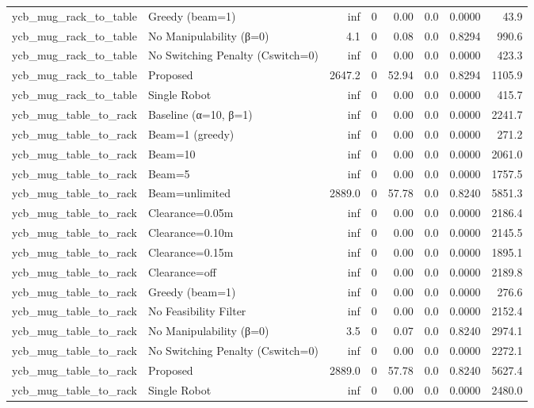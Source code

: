 \begin{table}[ht]
{\begin{tabular}{l l r r r r r r}
  ycb\_mug\_rack\_to\_table & Greedy (beam=1) & inf & 0 & 0.00 & 0.0 & 0.0000 & 43.9 \\
  ycb\_mug\_rack\_to\_table & No Manipulability (β=0) & 4.1 & 0 & 0.08 & 0.0 & 0.8294 & 990.6 \\
  ycb\_mug\_rack\_to\_table & No Switching Penalty (Cswitch=0) & inf & 0 & 0.00 & 0.0 & 0.0000 & 423.3 \\
  ycb\_mug\_rack\_to\_table & Proposed & 2647.2 & 0 & 52.94 & 0.0 & 0.8294 & 1105.9 \\
  ycb\_mug\_rack\_to\_table & Single Robot & inf & 0 & 0.00 & 0.0 & 0.0000 & 415.7 \\
  ycb\_mug\_table\_to\_rack & Baseline (α=10, β=1) & inf & 0 & 0.00 & 0.0 & 0.0000 & 2241.7 \\
  ycb\_mug\_table\_to\_rack & Beam=1 (greedy) & inf & 0 & 0.00 & 0.0 & 0.0000 & 271.2 \\
  ycb\_mug\_table\_to\_rack & Beam=10 & inf & 0 & 0.00 & 0.0 & 0.0000 & 2061.0 \\
  ycb\_mug\_table\_to\_rack & Beam=5 & inf & 0 & 0.00 & 0.0 & 0.0000 & 1757.5 \\
  ycb\_mug\_table\_to\_rack & Beam=unlimited & 2889.0 & 0 & 57.78 & 0.0 & 0.8240 & 5851.3 \\
  ycb\_mug\_table\_to\_rack & Clearance=0.05m & inf & 0 & 0.00 & 0.0 & 0.0000 & 2186.4 \\
  ycb\_mug\_table\_to\_rack & Clearance=0.10m & inf & 0 & 0.00 & 0.0 & 0.0000 & 2145.5 \\
  ycb\_mug\_table\_to\_rack & Clearance=0.15m & inf & 0 & 0.00 & 0.0 & 0.0000 & 1895.1 \\
  ycb\_mug\_table\_to\_rack & Clearance=off & inf & 0 & 0.00 & 0.0 & 0.0000 & 2189.8 \\
  ycb\_mug\_table\_to\_rack & Greedy (beam=1) & inf & 0 & 0.00 & 0.0 & 0.0000 & 276.6 \\
  ycb\_mug\_table\_to\_rack & No Feasibility Filter & inf & 0 & 0.00 & 0.0 & 0.0000 & 2152.4 \\
  ycb\_mug\_table\_to\_rack & No Manipulability (β=0) & 3.5 & 0 & 0.07 & 0.0 & 0.8240 & 2974.1 \\
  ycb\_mug\_table\_to\_rack & No Switching Penalty (Cswitch=0) & inf & 0 & 0.00 & 0.0 & 0.0000 & 2272.1 \\
  ycb\_mug\_table\_to\_rack & Proposed & 2889.0 & 0 & 57.78 & 0.0 & 0.8240 & 5627.4 \\
  ycb\_mug\_table\_to\_rack & Single Robot & inf & 0 & 0.00 & 0.0 & 0.0000 & 2480.0 \\

\end{tabular}}
\end{table}
